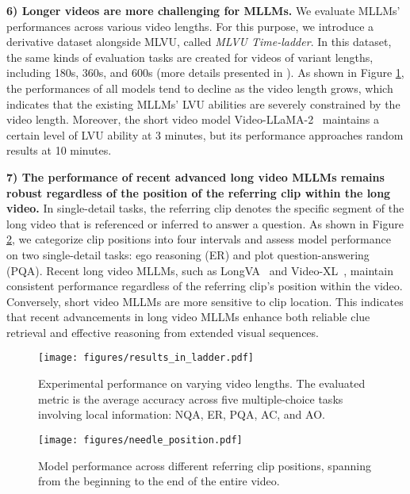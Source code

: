 \textbf{{6) Longer videos are more challenging for MLLMs. }}We evaluate MLLMs' performances across various video lengths. For this purpose, we introduce a derivative dataset alongside MLVU, called \textit{MLVU Time-ladder}. In this dataset, the same kinds of evaluation tasks are created for videos of variant lengths, including 180s, 360s, and 600s (more details presented in ). As shown in Figure \ref{fig:length}, the performances of all models tend to decline as the video length grows, which indicates that the existing MLLMs' LVU abilities are severely constrained by the video length. Moreover, the short video model Video-LLaMA-2~\cite{videollama} maintains a certain level of LVU ability at 3 minutes, but its performance approaches random results at 10 minutes.

\textbf{7) The performance of recent advanced long video MLLMs remains robust regardless of the position of the referring clip within the long video.} In single-detail tasks, the referring clip denotes the specific segment of the long video that is referenced or inferred to answer a question. As shown in Figure \ref{fig:needle_position}, we categorize clip positions into four intervals and assess model performance on two single-detail tasks: ego reasoning (ER) and plot question-answering (PQA). Recent long video MLLMs, such as LongVA~\cite{zhang2024longva} and Video-XL~\cite{shu2024videoxl}, maintain consistent performance regardless of the referring clip's position within the video. Conversely, short video MLLMs are more sensitive to clip location. This indicates that recent advancements in long video MLLMs enhance both reliable clue retrieval and effective reasoning from extended visual sequences.

\begin{figure}[t]
    \centering
    \texttt{[image: figures/results\_in\_ladder.pdf]}
    \vspace{-0.2cm}
    \caption{Experimental performance on varying video lengths. The evaluated metric is the average accuracy across five multiple-choice tasks involving local information: NQA, ER, PQA, AC, and AO.}  
    \label{fig:length}
    \vspace{-0.3cm}
\end{figure}

\begin{figure}[t]
    \centering
    \texttt{[image: figures/needle\_position.pdf]}
    \vspace{-0.3cm}
    \caption{Model performance across different referring clip positions, spanning from the beginning to the end of the entire video.} 
    \vspace{-0.6cm}
    \label{fig:needle_position}
\end{figure}

